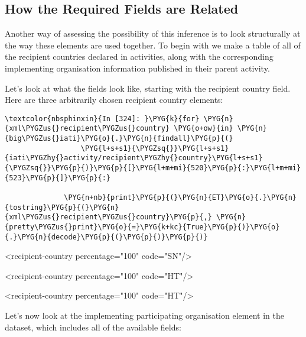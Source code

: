 \documentclass[letterpaper,10pt,english]{sphinxmanual}
\begin{document}
\subsection{How the Required Fields are Related}
\label{\detokenize{Global Affairs Canada - Compliance Report:How-the-Required-Fields-are-Related}}
Another way of assessing the possibility of this inference is to look
structurally at the way these elements are used together. To begin with
we make a table of all of the recipient countries declared in
activities, along with the corresponding implementing organisation
information published in their parent activity.

Let's look at what the fields look like, starting with the recipient
country field. Here are three arbitrarily chosen recipient country
elements:

\begin{Verbatim}[commandchars=\\\{\}]
\textcolor{nbsphinxin}{In [324]: }\PYG{k}{for} \PYG{n}{xml\PYGZus{}recipient\PYGZus{}country} \PYG{o+ow}{in} \PYG{n}{big\PYGZus{}iati}\PYG{o}{.}\PYG{n}{findall}\PYG{p}{(}
                  \PYG{l+s+s1}{\PYGZsq{}}\PYG{l+s+s1}{iati\PYGZhy{}activity/recipient\PYGZhy{}country}\PYG{l+s+s1}{\PYGZsq{}}\PYG{p}{)}\PYG{p}{[}\PYG{l+m+mi}{520}\PYG{p}{:}\PYG{l+m+mi}{523}\PYG{p}{]}\PYG{p}{:}
          
              \PYG{n+nb}{print}\PYG{p}{(}\PYG{n}{ET}\PYG{o}{.}\PYG{n}{tostring}\PYG{p}{(}\PYG{n}{xml\PYGZus{}recipient\PYGZus{}country}\PYG{p}{,} \PYG{n}{pretty\PYGZus{}print}\PYG{o}{=}\PYG{k+kc}{True}\PYG{p}{)}\PYG{o}{.}\PYG{n}{decode}\PYG{p}{(}\PYG{p}{)}\PYG{p}{)}
\end{Verbatim}
%
\begin{OriginalVerbatim}[commandchars=\\\{\}]
<recipient-country percentage="100" code="SN"/>

<recipient-country percentage="100" code="HT"/>

<recipient-country percentage="100" code="HT"/>

\end{OriginalVerbatim}
\relax
Let's now look at the implementing participating organisation element in
the dataset, which includes all of the available fields:
\end{document}
